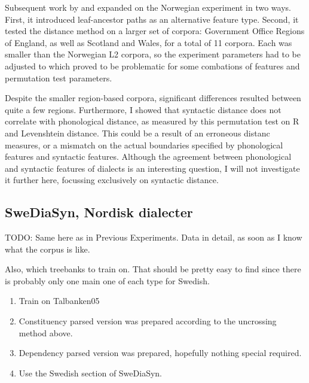\documentclass[11pt]{article}
\begin{document}
Subsequent work by  and 
expanded on the Norwegian experiment in two ways. First, it introduced
leaf-ancestor paths as an alternative feature type. Second, it tested
the distance method on a larger set of corpora: Government Office
Regions of England, as well as Scotland and Wales, for a total of
11 corpora. Each was smaller than the Norwegian L2 corpora, so the
experiment parameters had to be adjusted to which
proved to be problematic for some combations of features and
permutation test parameters.

Despite the smaller region-based corpora, significant differences
resulted between quite a few regions. Furthermore, I showed that
syntactic distance does not correlate with phonological distance, as
measured by this permutation test on R and Levenshtein distance. This
could be a result of an erroneous distanc measures, or a mismatch on
the actual boundaries specified by phonological features and syntactic
features. Although the agreement between phonological and syntactic
features of dialects is an interesting question, I will not
investigate it further here, focussing exclusively on syntactic
distance.

\subsection{SweDiaSyn, Nordisk dialecter}

TODO: Same here as in Previous Experiments. Data in detail, as soon as
I know what the corpus is like.

Also, which treebanks to train on. That should be pretty easy to find
since there is probably only one main one of each type for Swedish.

\begin{enumerate}
\item Train on Talbanken05
\item Constituency parsed version was prepared according to the
  uncrossing method above.
\item Dependency parsed version was prepared, hopefully nothing
  special required.
\item Use the Swedish section of SweDiaSyn.
\end{enumerate}

\end{document}
